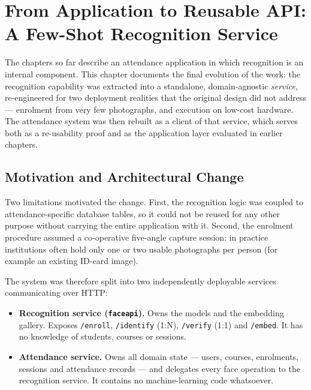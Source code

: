 \documentclass[12pt,a4paper]{report}
\begin{document}
\chapter{From Application to Reusable API: A Few-Shot Recognition Service}
\label{chap:api}

The chapters so far describe an attendance application in which recognition is an
internal component. This chapter documents the final evolution of the work: the
recognition capability was extracted into a standalone, domain-agnostic
\emph{service}, re-engineered for two deployment realities that the original
design did not address --- enrolment from very few photographs, and execution on
low-cost hardware. The attendance system was then rebuilt as a client of that
service, which serves both as a re-usability proof and as the application layer
evaluated in earlier chapters.

\section{Motivation and Architectural Change}
\label{sec:api-motivation}

Two limitations motivated the change. First, the recognition logic was coupled to
attendance-specific database tables, so it could not be reused for any other
purpose without carrying the entire application with it. Second, the enrolment
procedure assumed a co-operative five-angle capture session; in practice
institutions often hold only one or two usable photographs per person (for
example an existing ID-card image).

The system was therefore split into two independently deployable services
communicating over HTTP:

\begin{itemize}
  \item \textbf{Recognition service (\texttt{faceapi}).} Owns the models and the
        embedding gallery. Exposes \texttt{/enroll}, \texttt{/identify} (1:N),
        \texttt{/verify} (1:1) and \texttt{/embed}. It has no knowledge of
        students, courses or sessions.
  \item \textbf{Attendance service.} Owns all domain state --- users, courses,
        enrolments, sessions and attendance records --- and delegates every face
        operation to the recognition service. It contains no machine-learning
        code whatsoever.
\end{itemize}
\end{document}
